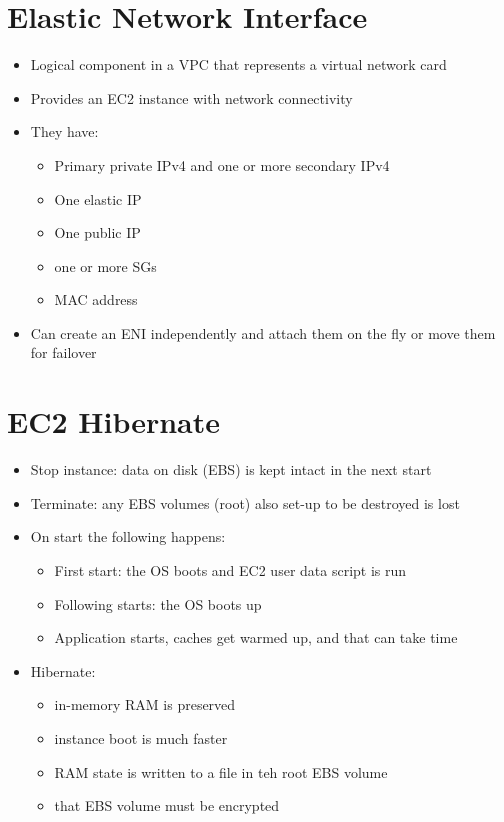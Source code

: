 \documentclass[]{scrartcl}
\begin{document}
\section{Elastic Network Interface}
\begin{itemize}
	\item Logical component in a VPC that represents a virtual network card
	\item Provides an EC2 instance with network connectivity
	\item They have:
	\begin{itemize}
		\item Primary private IPv4 and one or more secondary IPv4
		\item One elastic IP
		\item One public IP
		\item one or more SGs
		\item MAC address
	\end{itemize}
	\item Can create an ENI independently and attach them on the fly or move them for failover
\end{itemize}

\section{EC2 Hibernate}
\begin{itemize}
	\item Stop instance: data on disk (EBS) is kept intact in the next start
	\item Terminate: any EBS volumes (root) also set-up to be destroyed is lost
	\item On start the following happens:
	\begin{itemize}
		\item First start: the OS boots and EC2 user data script is run
		\item Following starts: the OS boots up
		\item Application starts, caches get warmed up, and that can take time
	\end{itemize}
	\item Hibernate:
	\begin{itemize}
		\item in-memory RAM is preserved
		\item instance boot is much faster
		\item RAM state is written to a file in teh root EBS volume
		\item that EBS volume must be encrypted
	\end{itemize}
\end{itemize}
\end{document}
